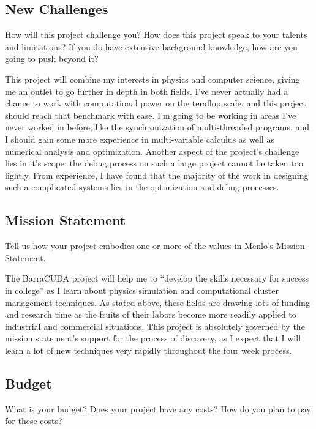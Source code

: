 \documentclass[10pt]{article}
\begin{document}
\subsection{New Challenges}
How will this project challenge you? How does this project speak to your talents and limitations? If you do have extensive background knowledge, how are you going to push beyond it?

This project will combine my interests in physics and computer science, giving me an outlet to go further in depth in both fields. I've never actually had a chance to work with computational power on the teraflop scale, and this project should reach that benchmark with ease. I'm going to be working in areas I've never worked in before, like the synchronization of multi-threaded programs, and I should gain some more experience in multi-variable calculus as well as numerical analysis and optimization. Another aspect of the project's challenge lies in it's scope: the debug process on such a large project cannot be taken too lightly. From experience, I have found that the majority of the work in designing such a complicated systems lies in the optimization and debug processes.


\subsection{Mission Statement}
Tell us how your project embodies one or more of the values in Menlo's Mission Statement.

The BarraCUDA project will help me to ``develop the skills necessary for success in college'' as I learn about physics simulation and computational cluster management techniques.  As stated above, these fields are drawing lots of funding and research time as the fruits of their labors become more readily applied to industrial and commercial situations. This project is absolutely governed by the mission statement's support for the process of discovery, as I expect that I will learn a lot of new techniques very rapidly throughout the four week process. 

\subsection{Budget}
What is your budget? Does your project have any costs? How do you plan to pay for these costs?
\end{document}
